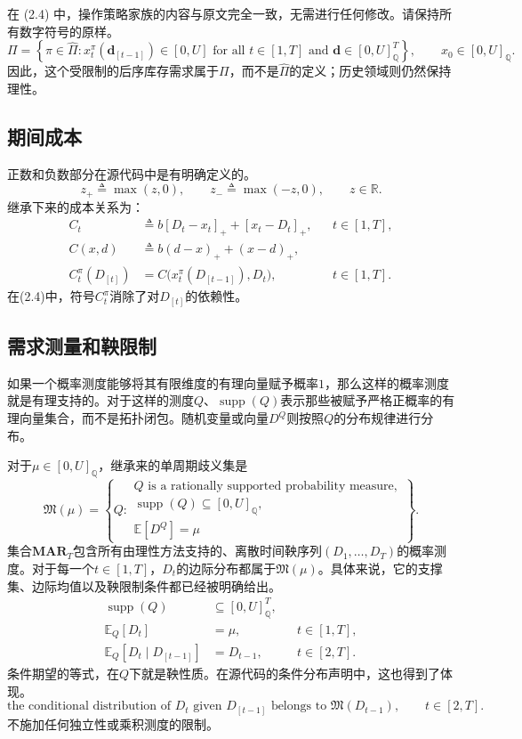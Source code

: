 \documentclass{article}
\begin{document}
在 (2.4) 中，操作策略家族的内容与原文完全一致，无需进行任何修改。请保持所有数字符号的原样。
\[
\Pi=\left\{\pi\in\hat\Pi:
 x_t^\pi(\mathbf d_{[t-1]})\in[0,U]
 \text{ for all }t\in[1,T]\text{ and }
 \mathbf d\in[0,U]_{\mathbb{Q}}^T
 \right\},\qquad x_0\in[0,U]_{\mathbb{Q}}.
\]
因此，这个受限制的后序库存需求属于\(\Pi\)，而不是\(\hat\Pi\)的定义；历史领域则仍然保持理性。

\subsection*{期间成本}
正数和负数部分在源代码中是有明确定义的。
\[
z_+\triangleq\max(z,0),\qquad
z_-\triangleq\max(-z,0),\qquad z\in\mathbb{R}.
\]
继承下来的成本关系为：
\begin{align*}
C_t&\triangleq b[D_t-x_t]_+ +[x_t-D_t]_+,
&&t\in[1,T],\\
C(x,d)&\triangleq b(d-x)_+ +(x-d)_+,\\
C_t^\pi(D_{[t]})&=C\bigl(x_t^\pi(D_{[t-1]}),D_t\bigr),
&&t\in[1,T].
\end{align*}
在(2.4)中，符号\(C_t^\pi\)消除了对\(D_{[t]}\)的依赖性。

\subsection*{需求测量和鞅限制}
如果一个概率测度能够将其有限维度的有理向量赋予概率\(1\)，那么这样的概率测度就是有理支持的。对于这样的测度\(Q\)、\(\operatorname{supp}(Q)\)表示那些被赋予严格正概率的有理向量集合，而不是拓扑闭包。随机变量或向量\(D^Q\)则按照\(Q\)的分布规律进行分布。

对于\(\mu\in[0,U]_{\mathbb{Q}}\)，继承来的单周期歧义集是
\[
\mathfrak M(\mu)=
\left\{Q:\begin{array}{l}
Q\text{ is a rationally supported probability measure},\\
\operatorname{supp}(Q)\subseteq[0,U]_{\mathbb{Q}},\\
\mathbb{E}[D^Q]=\mu
\end{array}\right\}.
\]
集合\(\mathbf{MAR}_T\)包含所有由理性方法支持的、离散时间鞅序列\((D_1,\ldots,D_T)\)的概率测度。对于每一个\(t\in[1,T]\)，\(D_t\)的边际分布都属于\(\mathfrak M(\mu)\)。具体来说，它的支撑集、边际均值以及鞅限制条件都已经被明确给出。
\begin{align*}
\operatorname{supp}(Q)&\subseteq[0,U]_{\mathbb{Q}}^T,\\
\mathbb{E}_Q[D_t]&=\mu,
&&t\in[1,T],\\
\mathbb{E}_Q[D_t\mid D_{[t-1]}]&=D_{t-1},
&&t\in[2,T].
\end{align*}
条件期望的等式，在\(Q\)下就是鞅性质。在源代码的条件分布声明中，这也得到了体现。
\[
\text{the conditional distribution of }D_t\text{ given }D_{[t-1]}
\text{ belongs to }\mathfrak M(D_{t-1}),\qquad t\in[2,T].
\]
不施加任何独立性或乘积测度的限制。
\end{document}
